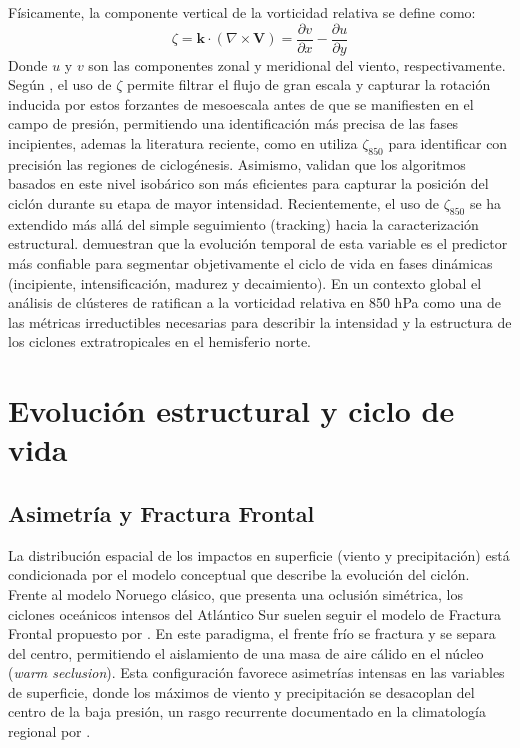 Físicamente, la componente vertical de la vorticidad relativa se define como:
\begin{equation}
    \zeta = \mathbf{k} \cdot (\nabla \times \mathbf{V}) = \frac{\partial v}{\partial x} - \frac{\partial u}{\partial y}
\end{equation}
Donde $u$ y $v$ son las componentes zonal y meridional del viento, respectivamente. Según \citet{hoskins2005new}, el uso de $\zeta$ permite filtrar el flujo de gran escala y capturar la rotación inducida por estos forzantes de mesoescala antes de que se manifiesten en el campo de presión, permitiendo una identificación más precisa de las fases incipientes, ademas la literatura reciente, como en \citet{gramcianinov2019properties} utiliza $\zeta_{850}$ para identificar con precisión las regiones de ciclogénesis. Asimismo, \citet{padilhareinke2024objective} validan que los algoritmos basados en este nivel isobárico son más eficientes para capturar la posición del ciclón durante su etapa de mayor intensidad. Recientemente, el uso de $\zeta_{850}$ se ha extendido más allá del simple seguimiento (tracking) hacia la caracterización estructural. \citet{coutodesouza2024new} demuestran que la evolución temporal de esta variable es el predictor más confiable para segmentar objetivamente el ciclo de vida en fases dinámicas (incipiente, intensificación, madurez y decaimiento). En un contexto global el análisis de clústeres de \citet{corner2025classification} ratifican a la vorticidad relativa en 850 hPa como una de las métricas irreductibles necesarias para describir la intensidad y la estructura de los ciclones extratropicales en el hemisferio norte.
\section{Evolución estructural y ciclo de vida}\label{sec:mt_evolucion}

\subsection{Asimetría y Fractura Frontal}\label{subsec:mt_modelos}
La distribución espacial de los impactos en superficie (viento y precipitación) está condicionada por el modelo conceptual que describe la evolución del ciclón. Frente al modelo Noruego clásico, que presenta una oclusión simétrica, los ciclones oceánicos intensos del Atlántico Sur suelen seguir el modelo de Fractura Frontal propuesto por \citet{shapiro1990life}. En este paradigma, el frente frío se fractura y se separa del centro, permitiendo el aislamiento de una masa de aire cálido en el núcleo (\textit{warm seclusion}). Esta configuración favorece asimetrías intensas en las variables de superficie, donde los máximos de viento y precipitación se desacoplan del centro de la baja presión, un rasgo recurrente documentado en la climatología regional por \citet{reboita2010south}.


